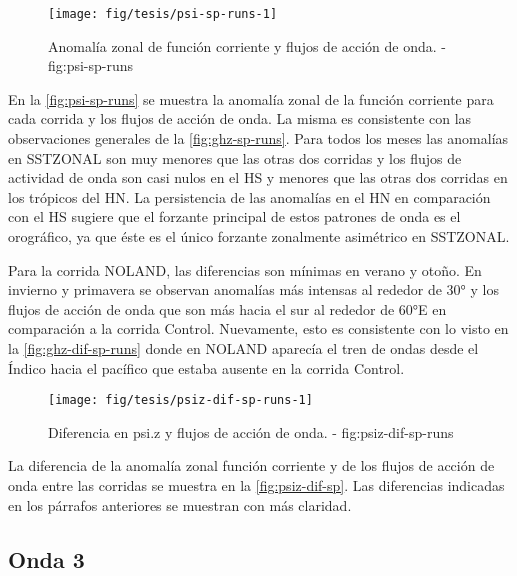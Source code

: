\documentclass[spanish,a4paper]{book}
\begin{document}
\begin{landscape}\begin{figure}

{\centering \texttt{[image: fig/tesis/psi-sp-runs-1]} 

}

\caption{Anomalía zonal de función corriente y flujos de acción de onda. - fig:psi-sp-runs}\label{fig:psi-sp-runs}
\end{figure}
\end{landscape}

En la \autoref{fig:psi-sp-runs} se muestra la anomalía zonal de la
función corriente para cada corrida y los flujos de acción de onda. La
misma es consistente con las observaciones generales de la
\autoref{fig:ghz-sp-runs}. Para todos los meses las anomalías en
SSTZONAL son muy menores que las otras dos corridas y los flujos de
actividad de onda son casi nulos en el HS y menores que las otras dos
corridas en los trópicos del HN. La persistencia de las anomalías en el
HN en comparación con el HS sugiere que el forzante principal de estos
patrones de onda es el orográfico, ya que éste es el único forzante
zonalmente asimétrico en SSTZONAL.

Para la corrida NOLAND, las diferencias son mínimas en verano y otoño.
En invierno y primavera se observan anomalías más intensas al rededor de
30° y los flujos de acción de onda que son más hacia el sur al rededor
de 60°E en comparación a la corrida Control. Nuevamente, esto es
consistente con lo visto en la \autoref{fig:ghz-dif-sp-runs} donde en
NOLAND aparecía el tren de ondas desde el Índico hacia el pacífico que
estaba ausente en la corrida Control.

\begin{figure*}
\texttt{[image: fig/tesis/psiz-dif-sp-runs-1]} \caption{Diferencia en psi.z y flujos de acción de onda. - fig:psiz-dif-sp-runs}\label{fig:psiz-dif-sp-runs}
\end{figure*}

La diferencia de la anomalía zonal función corriente y de los flujos de
acción de onda entre las corridas se muestra en la
\autoref{fig:psiz-dif-sp}. Las diferencias indicadas en los párrafos
anteriores se muestran con más claridad.


\subsection{Onda 3}\label{onda-3-2}
\end{document}
